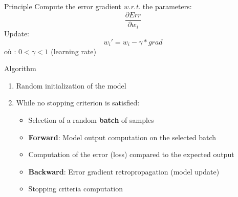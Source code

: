 
\begin{frame}{Principle}
  Compute the error gradient \emph{w.r.t.} the parameters:
  \[
  \frac{\partial{Err}}{\partial{w_i}}
  \]
  Update:
  \[
  w_i' = w_i - \gamma * grad 
  \]
  où : $0 < \gamma < 1$ (learning rate)
\end{frame}

\begin{frame}{Algorithm}
  \begin{enumerate}[<+->]
    \item Random initialization of the model
    \item While no stopping criterion is satisfied:
      \begin{itemize}
        \item Selection of a random \textbf{batch} of samples
        \item \textbf{Forward}: Model output computation on the selected batch
        \item Computation of the error (loss) compared to the expected output
        \item \textbf{Backward}: Error gradient retropropagation (model update)
        \item Stopping criteria computation
      \end{itemize}
  \end{enumerate}
\end{frame}


